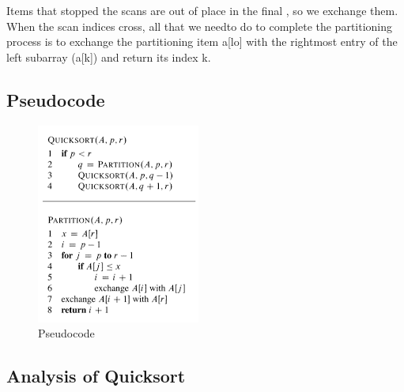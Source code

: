 \documentclass[12pt]{article}
\begin{document}
\par Items that stopped the scans are out of place in the final , so we exchange them. When the scan indices cross, all that we needto do to complete the partitioning process is to exchange the partitioning item a[lo] with the rightmost entry of the left subarray (a[k]) and return its index k. 
\subsection{Pseudocode}
\begin{figure}[h]
        \begin{center}
                \includegraphics[scale=0.7]{index5}
        \end{center}
        \caption{Pseudocode}
        \label{fig:shapes}
\end{figure}
\subsection{Analysis of Quicksort}
\end{document}
